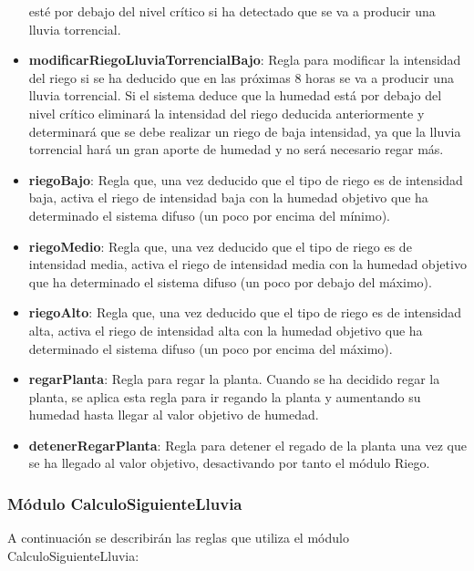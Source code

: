 \documentclass[11pt,a4paper]{article}
\begin{document}
\begin{itemize}
	esté por debajo del nivel crítico si ha detectado que se va a producir una lluvia torrencial.
	\item \textbf{modificarRiegoLluviaTorrencialBajo}: Regla para modificar la intensidad del riego si se ha deducido que en las
	próximas 8 horas se va a producir una lluvia torrencial. Si el sistema deduce que la humedad está por debajo del nivel
	crítico eliminará la intensidad del riego deducida anteriormente y determinará que se debe realizar un riego de baja intensidad,
	ya que la lluvia torrencial hará un gran aporte de humedad y no será necesario regar más.
	\item \textbf{riegoBajo}: Regla que, una vez deducido que el tipo de riego es de intensidad baja, activa el riego de
	intensidad baja con la humedad objetivo que ha determinado el sistema difuso (un poco por encima del mínimo).
	\item \textbf{riegoMedio}: Regla que, una vez deducido que el tipo de riego es de intensidad media, activa el riego de
	intensidad media con la humedad objetivo que ha determinado el sistema difuso (un poco por debajo del máximo).
	\item \textbf{riegoAlto}: Regla que, una vez deducido que el tipo de riego es de intensidad alta, activa el riego de
	intensidad alta con la humedad objetivo que ha determinado el sistema difuso (un poco por encima del máximo).
	\item \textbf{regarPlanta}: Regla para regar la planta. Cuando se ha decidido regar la planta, se aplica esta regla para ir
	regando la planta y aumentando su humedad hasta llegar al valor objetivo de humedad.
	\item \textbf{detenerRegarPlanta}: Regla para detener el regado de la planta una vez que se ha llegado al valor
	objetivo, desactivando por tanto el módulo Riego.
\end{itemize}

\subsubsection{Módulo CalculoSiguienteLluvia}

A continuación se describirán las reglas que utiliza el módulo CalculoSiguienteLluvia:
\end{document}
